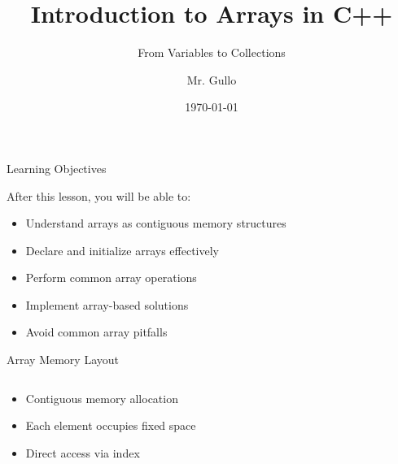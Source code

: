 \documentclass{beamer}
\title[Intro to Arrays]{Introduction to Arrays in C++}
\subtitle{From Variables to Collections}
\author[Mr. Gullo]{Mr. Gullo}
\date[\today]{\today}
\begin{document}
\begin{frame}
    \titlepage
\end{frame}

\begin{frame}{Learning Objectives}
    \begin{block}{After this lesson, you will be able to:}
        \begin{itemize}
            \item Understand arrays as contiguous memory structures
            \item Declare and initialize arrays effectively
            \item Perform common array operations
            \item Implement array-based solutions
            \item Avoid common array pitfalls
        \end{itemize}
    \end{block}
\end{frame}

\begin{frame}{Array Memory Layout}
    \begin{columns}[T]
        \begin{column}{0.5\textwidth}
            \begin{itemize}
                \item Contiguous memory allocation
                \item Each element occupies fixed space
                \item Direct access via index
            \end{itemize}
        \end{column}
        \begin{column}{0.5\textwidth}
        \end{column}
    \end{columns}
\end{frame}
\end{document}
